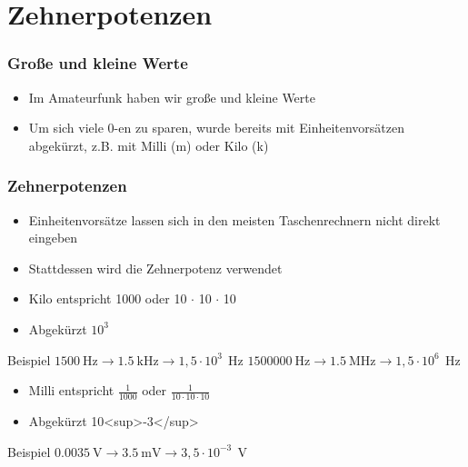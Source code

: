 
\section{Zehnerpotenzen}
\label{section:zehnerpotenzen}
\begin{frame}%

\frametitle{Große und kleine Werte}
\begin{itemize}
  \item Im Amateurfunk haben wir große und kleine Werte
  \item Um sich viele 0-en zu sparen, wurde bereits mit Einheitenvorsätzen abgekürzt, z.B. mit Milli (m) oder Kilo (k)
  \end{itemize}
\end{frame}

\begin{frame}
\frametitle{Zehnerpotenzen}
\begin{itemize}
  \item Einheitenvorsätze lassen sich in den meisten Taschenrechnern nicht direkt eingeben
  \item Stattdessen wird die Zehnerpotenz verwendet
  \item Kilo entspricht 1000 oder 10 $\cdot$ 10 $\cdot$ 10
  \item Abgekürzt $10^3$
  \end{itemize}
    \pause
    \vspace{1cm}
    \begin{exampleblock}{Beispiel}
        $\qty{1500}{\hertz} \rightarrow \qty{1,5}{\kilo\hertz} \rightarrow 1,5 \cdot 10^3~\qty{}{\hertz}$
        $\qty{1500000}{\hertz} \rightarrow \qty{1,5}{\mega\hertz} \rightarrow 1,5 \cdot 10^6~\qty{}{\hertz}$
    \end{exampleblock}
\end{frame}

\begin{frame}\begin{itemize}
  \item Milli entspricht  $\frac{1}{1000}$ oder $\frac{1}{10 \cdot 10 \cdot 10}$
  \item Abgekürzt 10<sup>-3</sup>
  \end{itemize}
    \pause
    \begin{exampleblock}{Beispiel}
        $\qty{0,0035}{\volt} \rightarrow \qty{3,5}{\milli\volt} \rightarrow 3,5 \cdot 10^{-3}~\qty{}{\volt}$
    \end{exampleblock}
\end{frame}

